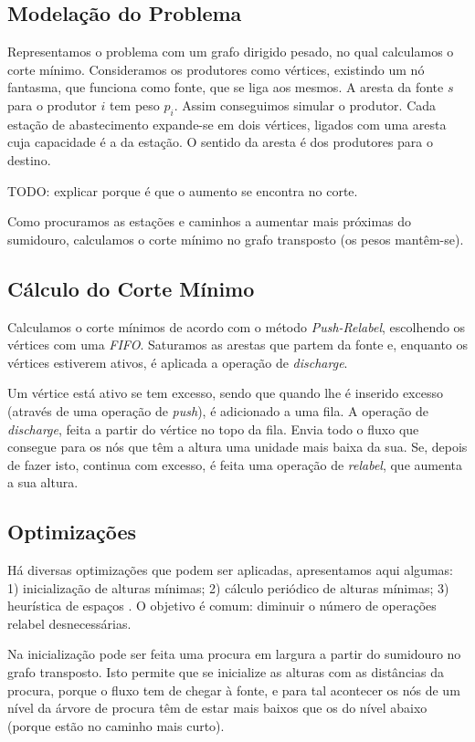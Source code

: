 \documentclass[a4paper, 12pt, conference, portuguese]{ieeeconf}
\begin{document}
\subsection{Modelação do Problema}

Representamos o problema com um grafo dirigido pesado, no qual
calculamos o corte mínimo. Consideramos os produtores como
vértices, existindo um nó fantasma, que funciona como fonte, que
se liga aos mesmos. A aresta da fonte $s$ para o produtor $i$ tem
peso $p_i$. Assim conseguimos simular o produtor. Cada estação de
abastecimento expande-se em dois vértices, ligados com uma aresta
cuja capacidade é a da estação. O sentido da aresta é dos produtores
para o destino.

TODO: explicar porque é que o aumento se encontra no corte.

Como procuramos as estações e caminhos a aumentar mais próximas
do sumidouro, calculamos o corte mínimo no grafo transposto (os
pesos mantêm-se).

\subsection{Cálculo do Corte Mínimo}
Calculamos o corte mínimos de acordo com o método
\textit{Push-Relabel}\cite{pre-flow}, escolhendo os vértices com
uma \textit{FIFO}. Saturamos as arestas que
partem da fonte e, enquanto os vértices estiverem ativos, é
aplicada a operação de \textit{discharge}.

Um vértice está ativo se tem excesso, sendo que quando lhe é
inserido excesso (através de uma operação de \textit{push}), é adicionado
a uma fila. A operação de \textit{discharge}, feita a partir do vértice
no topo da fila. Envia todo o fluxo que consegue para os nós que
têm a altura uma unidade mais baixa da sua. Se, depois de fazer
isto, continua com excesso, é feita uma operação de
\textit{relabel}, que aumenta a sua altura.

\subsection{Optimizações}

Há diversas optimizações que podem ser aplicadas, apresentamos
aqui algumas: 1) inicialização de alturas mínimas; 2) cálculo
periódico de alturas mínimas; 3) heurística de espaços .
O objetivo é comum: diminuir o número de operações relabel desnecessárias.

Na inicialização pode ser feita uma procura em largura
a partir do sumidouro no grafo transposto. Isto permite que se inicialize
as alturas com as distâncias da procura, porque o fluxo tem de
chegar à fonte, e para tal acontecer os nós de um nível da árvore
de procura têm de estar mais baixos que os do nível abaixo
(porque estão no caminho mais curto).
\end{document}
